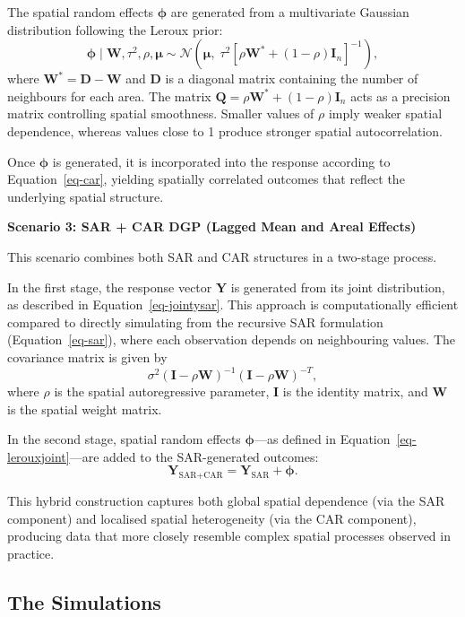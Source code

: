 \documentclass[a4paper,reqno]{amsart}
\begin{document}
The spatial random effects $\boldsymbol{\phi}$ are generated from a
multivariate Gaussian distribution following the Leroux prior:
\begin{equation}
\label{eq-lerouxjoint}
\boldsymbol{\phi} \mid \mathbf{W}, \tau^2, \rho, \boldsymbol{\mu}
\sim \mathcal{N}\!\left(
\boldsymbol{\mu},\;
\tau^2 \left[ \rho \mathbf{W}^* + (1 - \rho)\mathbf{I}_n \right]^{-1}
\right),
\end{equation}
where $\mathbf{W}^* = \mathbf{D} - \mathbf{W}$ and $\mathbf{D}$ is a
diagonal matrix containing the number of neighbours for each area. The
matrix $\mathbf{Q} = \rho \mathbf{W}^* + (1 - \rho)\mathbf{I}_n$ acts as
a precision matrix controlling spatial smoothness. Smaller values of
$\rho$ imply weaker spatial dependence, whereas values close to 1
produce stronger spatial autocorrelation.

Once $\boldsymbol{\phi}$ is generated, it is incorporated into the
response according to Equation~\ref{eq-car}, yielding spatially
correlated outcomes that reflect the underlying spatial structure.

\textbf{Scenario 3: SAR + CAR DGP (Lagged Mean and Areal Effects)}

This scenario combines both SAR and CAR structures in a two-stage
process.

In the first stage, the response vector $\mathbf{Y}$ is generated from
its joint distribution, as described in Equation~\ref{eq-jointysar}.
This approach is computationally efficient compared to directly
simulating from the recursive SAR formulation (Equation~\ref{eq-sar}),
where each observation depends on neighbouring values. The covariance
matrix is given by
\[
\sigma^2 (\mathbf{I} - \rho \mathbf{W})^{-1}
(\mathbf{I} - \rho \mathbf{W})^{-T},
\]
where $\rho$ is the spatial autoregressive parameter, $\mathbf{I}$ is
the identity matrix, and $\mathbf{W}$ is the spatial weight matrix.

In the second stage, spatial random effects $\boldsymbol{\phi}$—as
defined in Equation~\ref{eq-lerouxjoint}—are added to the SAR-generated
outcomes:
\[
\mathbf{Y}_{\text{SAR+CAR}} = \mathbf{Y}_{\text{SAR}} + \boldsymbol{\phi}.
\]

This hybrid construction captures both global spatial dependence (via
the SAR component) and localised spatial heterogeneity (via the CAR
component), producing data that more closely resemble complex spatial
processes observed in practice.

\subsection{The Simulations}\label{simulations}
\end{document}
